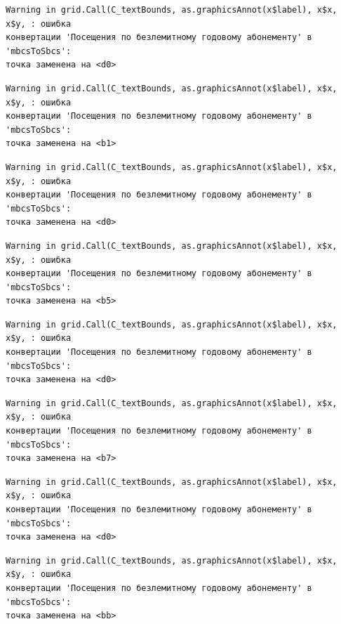 \documentclass[
  letterpaper,
  DIV=11,
  numbers=noendperiod]{scrreprt}
\begin{document}
\begin{verbatim}
Warning in grid.Call(C_textBounds, as.graphicsAnnot(x$label), x$x, x$y, : ошибка
конвертации 'Посещения по безлемитному годовому абонементу' в 'mbcsToSbcs':
точка заменена на <d0>
\end{verbatim}

\begin{verbatim}
Warning in grid.Call(C_textBounds, as.graphicsAnnot(x$label), x$x, x$y, : ошибка
конвертации 'Посещения по безлемитному годовому абонементу' в 'mbcsToSbcs':
точка заменена на <b1>
\end{verbatim}

\begin{verbatim}
Warning in grid.Call(C_textBounds, as.graphicsAnnot(x$label), x$x, x$y, : ошибка
конвертации 'Посещения по безлемитному годовому абонементу' в 'mbcsToSbcs':
точка заменена на <d0>
\end{verbatim}

\begin{verbatim}
Warning in grid.Call(C_textBounds, as.graphicsAnnot(x$label), x$x, x$y, : ошибка
конвертации 'Посещения по безлемитному годовому абонементу' в 'mbcsToSbcs':
точка заменена на <b5>
\end{verbatim}

\begin{verbatim}
Warning in grid.Call(C_textBounds, as.graphicsAnnot(x$label), x$x, x$y, : ошибка
конвертации 'Посещения по безлемитному годовому абонементу' в 'mbcsToSbcs':
точка заменена на <d0>
\end{verbatim}

\begin{verbatim}
Warning in grid.Call(C_textBounds, as.graphicsAnnot(x$label), x$x, x$y, : ошибка
конвертации 'Посещения по безлемитному годовому абонементу' в 'mbcsToSbcs':
точка заменена на <b7>
\end{verbatim}

\begin{verbatim}
Warning in grid.Call(C_textBounds, as.graphicsAnnot(x$label), x$x, x$y, : ошибка
конвертации 'Посещения по безлемитному годовому абонементу' в 'mbcsToSbcs':
точка заменена на <d0>
\end{verbatim}

\begin{verbatim}
Warning in grid.Call(C_textBounds, as.graphicsAnnot(x$label), x$x, x$y, : ошибка
конвертации 'Посещения по безлемитному годовому абонементу' в 'mbcsToSbcs':
точка заменена на <bb>
\end{verbatim}
\end{document}
